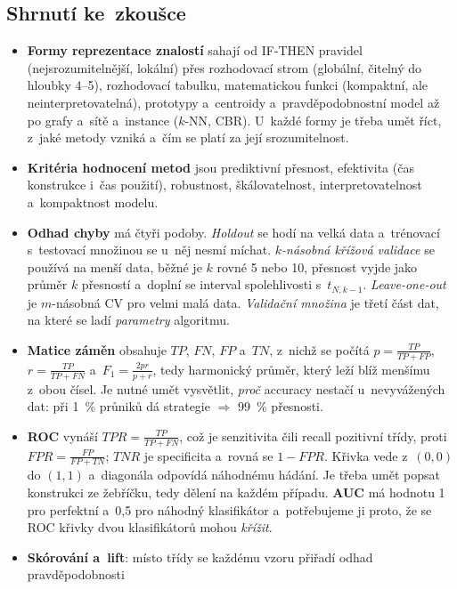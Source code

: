 \documentclass[11pt,a4paper]{article}
\theoremstyle{definition}
\begin{document}
\subsection{Shrnutí ke~zkoušce}

\begin{itemize}
\item \textbf{Formy reprezentace znalostí} sahají od IF-THEN pravidel (nejsrozumitelnější,
      lokální) přes rozhodovací strom (globální, čitelný do hloubky 4--5), rozhodovací tabulku,
      matematickou funkci (kompaktní, ale neinterpretovatelná), prototypy a~centroidy
      a~pravděpodobnostní model až po grafy a~sítě a~instance ($k$-NN, CBR). U~každé formy je
      třeba umět říct, z~jaké metody vzniká a~čím se platí za její srozumitelnost.
\item \textbf{Kritéria hodnocení metod} jsou prediktivní přesnost, efektivita (čas konstrukce
      i~čas použití), robustnost, škálovatelnost, interpretovatelnost a~kompaktnost modelu.
\item \textbf{Odhad chyby} má čtyři podoby. \emph{Holdout} se hodí na velká data a~trénovací
      s~testovací množinou se u~něj nesmí míchat. \emph{$k$-násobná křížová validace} se
      používá na menší data, běžné je $k$ rovné 5 nebo 10, přesnost vyjde jako průměr $k$
      přesností a~doplní se interval spolehlivosti s~$t_{N,k-1}$. \emph{Leave-one-out} je
      $m$-násobná CV pro velmi malá data. \emph{Validační množina} je třetí část dat, na které
      se ladí \emph{parametry} algoritmu.
\item \textbf{Matice záměn} obsahuje $TP$, $FN$, $FP$ a~$TN$, z~nichž se počítá
      $p=\frac{TP}{TP+FP}$, $r=\frac{TP}{TP+FN}$ a~$F_1=\frac{2pr}{p+r}$, tedy harmonický
      průměr, který leží blíž menšímu z~obou čísel. Je nutné umět vysvětlit, \emph{proč}
      accuracy nestačí u~nevyvážených dat: při 1~\% průniků dá strategie 
      $\Rightarrow$ 99~\% přesnosti.
\item \textbf{ROC} vynáší $\mathit{TPR}=\frac{TP}{TP+FN}$, což je senzitivita čili recall
      pozitivní třídy, proti $\mathit{FPR}=\frac{FP}{FP+TN}$; $\mathit{TNR}$ je specificita
      a~rovná se $1-\mathit{FPR}$. Křivka vede z~$(0,0)$ do $(1,1)$ a~diagonála odpovídá
      náhodnému hádání. Je třeba umět popsat konstrukci ze žebříčku, tedy dělení na každém
      případu. \textbf{AUC} má hodnotu 1 pro perfektní a~0,5 pro náhodný klasifikátor
      a~potřebujeme ji proto, že se ROC křivky dvou klasifikátorů mohou \emph{křížit}.
\item \textbf{Skórování a~lift}: místo třídy se každému vzoru přiřadí odhad pravděpodobnosti

\end{itemize}
\end{document}

